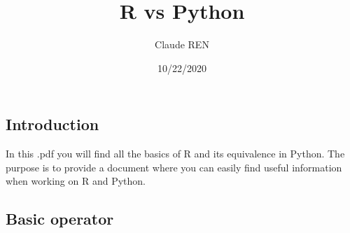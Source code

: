 \documentclass[
]{article}
\title{R vs Python}
\author{Claude REN}
\date{10/22/2020}
\begin{document}
\maketitle

\hypertarget{introduction}{%
\subsection{Introduction}\label{introduction}}

In this .pdf you will find all the basics of R and its equivalence in
Python. The purpose is to provide a document where you can easily find
useful information when working on R and Python.

\hypertarget{basic-operator}{%
\subsection{Basic operator}\label{basic-operator}}
\end{document}

